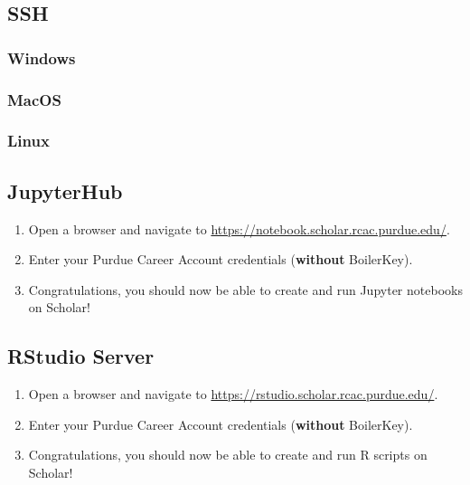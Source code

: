 \documentclass[
]{book}
\providecommand{\tightlist}{%
  \setlength{\itemsep}{0pt}\setlength{\parskip}{0pt}}
\begin{document}
\hypertarget{connecting-with-ssh}{%
\subsection{SSH}\label{connecting-with-ssh}}

\hypertarget{connecting-to-scholar-ssh-windows}{%
\subsubsection{Windows}\label{connecting-to-scholar-ssh-windows}}

\hypertarget{connecting-to-scholar-ssh-macos}{%
\subsubsection{MacOS}\label{connecting-to-scholar-ssh-macos}}

\hypertarget{connecting-to-scholar-ssh-linux}{%
\subsubsection{Linux}\label{connecting-to-scholar-ssh-linux}}

\hypertarget{jupyterhub}{%
\subsection{JupyterHub}\label{jupyterhub}}

\begin{enumerate}
\def\labelenumi{\arabic{enumi}.}
\tightlist
\item
  Open a browser and navigate to \url{https://notebook.scholar.rcac.purdue.edu/}.
\item
  Enter your Purdue Career Account credentials (\textbf{without} BoilerKey).
\item
  Congratulations, you should now be able to create and run Jupyter notebooks on Scholar!
\end{enumerate}

\hypertarget{rstudio-server}{%
\subsection{RStudio Server}\label{rstudio-server}}

\begin{enumerate}
\def\labelenumi{\arabic{enumi}.}
\tightlist
\item
  Open a browser and navigate to \url{https://rstudio.scholar.rcac.purdue.edu/}.
\item
  Enter your Purdue Career Account credentials (\textbf{without} BoilerKey).
\item
  Congratulations, you should now be able to create and run R scripts on Scholar!
\end{enumerate}
\end{document}
